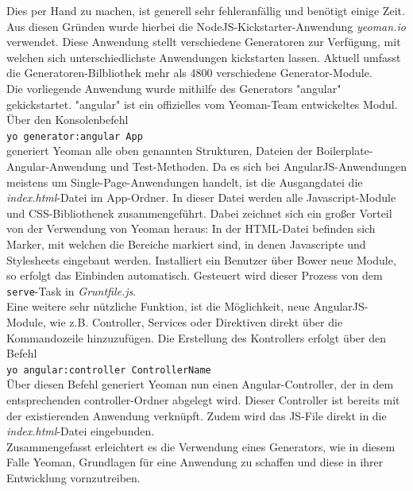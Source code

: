 Dies per Hand zu machen, ist generell sehr fehleranfällig und benötigt einige Zeit. Aus diesen Gründen wurde hierbei die NodeJS-Kickstarter-Anwendung \textit{yeoman.io} verwendet.
Diese Anwendung stellt verschiedene Generatoren zur Verfügung, mit welchen sich unterschiedlichste Anwendungen kickstarten lassen. Aktuell umfasst die Generatoren-Bilbliothek mehr als 4800 verschiedene
Generator-Module.\\
Die vorliegende Anwendung wurde mithilfe des Generators "angular" gekickstartet. "angular" ist ein offizielles vom Yeoman-Team entwickeltes Modul.
Über den Konsolenbefehl\\
\texttt{yo generator:angular App}\\
generiert Yeoman alle oben genannten Strukturen, Dateien der Boilerplate-Angular-Anwendung und Test-Methoden.
Da es sich bei AngularJS-Anwendungen meistens um Single-Page-Anwendungen handelt, ist die Ausgangdatei die \textit{index.html}-Datei im App-Ordner.
In dieser Datei werden alle Javascript-Module und CSS-Bibliothenek zusammengeführt. Dabei zeichnet sich ein großer Vorteil von der Verwendung von Yeoman heraus:
In der HTML-Datei befinden sich Marker, mit welchen die Bereiche markiert sind, in denen Javascripte und Stylesheets eingebaut werden. Installiert ein Benutzer über Bower neue Module, so erfolgt das Einbinden automatisch.
Gesteuert wird dieser Prozess von dem \texttt{serve}-Task in \textit{Gruntfile.js}.\\
Eine weitere sehr nützliche Funktion, ist die Möglichkeit, neue AngularJS-Module, wie z.B. Controller, Services oder Direktiven direkt über die Kommandozeile hinzuzufügen.
Die Erstellung des Kontrollers erfolgt über den Befehl \\
\texttt{yo angular:controller ControllerName}\\
Über diesen Befehl generiert Yeoman nun einen Angular-Controller, der in dem entsprechenden controller-Ordner abgelegt wird. Dieser Controller ist bereits mit der existierenden Anwendung
 verknüpft. Zudem wird das JS-File direkt in die \textit{index.html}-Datei eingebunden.\\
 Zusammengefasst erleichtert es die Verwendung eines Generators, wie in diesem Falle Yeoman, Grundlagen für eine Anwendung zu schaffen und diese in ihrer Entwicklung vornzutreiben.

